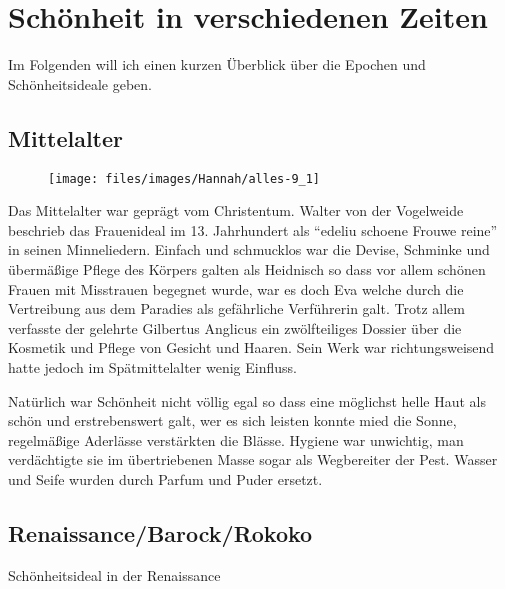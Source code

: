 \section{Schönheit in verschiedenen Zeiten}

Im Folgenden will ich einen kurzen Überblick über die Epochen und Schönheitsideale geben.

\subsection{Mittelalter}

\begin{wrapfigure}{r}{0pt}
	\texttt{[image: files/images/Hannah/alles-9\_1]}%
\end{wrapfigure}
Das Mittelalter war geprägt vom Christentum. Walter von der Vogelweide beschrieb das Frauenideal im
13. Jahrhundert als \enquote{edeliu schoene Frouwe reine} in seinen Minneliedern. Einfach und
schmucklos war die Devise, Schminke und übermäßige Pflege des Körpers galten als Heidnisch so dass
vor allem schönen Frauen mit Misstrauen begegnet wurde, war es doch Eva welche durch die Vertreibung
aus dem Paradies als gefährliche Verführerin galt. Trotz allem verfasste der gelehrte Gilbertus
Anglicus ein zwölfteiliges Dossier über die Kosmetik und Pflege von Gesicht und Haaren. Sein Werk war
richtungsweisend hatte jedoch im Spätmittelalter wenig Einfluss.

Natürlich war Schönheit nicht völlig egal so dass eine möglichst helle Haut als schön und
erstrebenswert galt, wer es sich leisten konnte mied die Sonne, regelmäßige Aderlässe verstärkten die
Blässe. Hygiene war unwichtig, man verdächtigte sie im übertriebenen Masse sogar als Wegbereiter der
Pest. Wasser und Seife wurden durch Parfum und Puder ersetzt.

\subsection{Renaissance/Barock/Rokoko}

\begin{figurewrapper}
	 \hfill
	\caption{Schönheitsideal in der Renaissance}
\end{figurewrapper}

